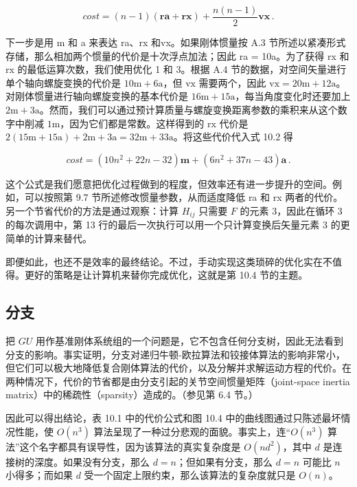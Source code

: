 \documentclass[10pt,a4paper]{book}
\theoremstyle{thmstyle} %
\theoremstyle{defstyle} %
\theoremstyle{prostyle} %
\begin{document}
$$
c o s t = ( n - 1 ) ( \mathbf { r a } + \mathbf { r x } ) + { \frac { n ( n - 1 ) } { 2 } } \mathbf { v x } \, .
$$



下一步是用 m 和 a 来表达 ra、rx 和vx。如果刚体惯量按 A.3 节所述以紧凑形式存储，那么相加两个惯量的代价是十次浮点加法；因此 ra = 10a。为了获得 rx 和 rx 的最低运算次数，我们使用优化 1 和 3。根据 A.4 节的数据，对空间矢量进行单个轴向螺旋变换的代价是 $10\mathrm{m}+6\mathrm{a}$，但 $\mathrm{v}\mathrm{x}$ 需要两个，因此 $\mathrm{v}\mathrm{x}=20\mathrm{m}+12\mathrm{a}$。对刚体惯量进行轴向螺旋变换的基本代价是 $16\mathrm{m}+15\mathrm{a}$，每当角度变化时还要加上 $2\mathrm{m}+3\mathrm{a}$。然而，我们可以通过预计算质量与螺旋变换距离参数的乘积来从这个数字中削减 $1\mathrm{m}$，因为它们都是常数。这样得到的 rx 代价是 $2(15\mathrm{m}+15\mathrm{a})+2\mathrm{m}+3\mathrm{a}=32\mathrm{m}+33\mathrm{a}$。将这些代价代入式 10.2 得



$$
c o s t = ( 10 n ^{2} + 22 n - 32 ) \mathbf { m } + ( 6 n ^{2} + 37 n - 43 ) \mathbf { a } \, .
$$



这个公式是我们愿意把优化过程做到的程度，但效率还有进一步提升的空间。例如，可以按照第 9.7 节所述修改惯量参数，从而适度降低 ra 和 rx 两者的代价。另一个节省代价的方法是通过观察：计算 $H_{ij}$ 只需要 $F$ 的元素 3，因此在循环 3 的每次调用中，第 13 行的最后一次执行可以用一个只计算变换后矢量元素 3 的更简单的计算来替代。



即便如此，也还不是效率的最终结论。不过，手动实现这类琐碎的优化实在不值得。更好的策略是让计算机来替你完成优化，这就是第 10.4 节的主题。



\subsection{分支}





把 $GU$ 用作基准刚体系统组的一个问题是，它不包含任何分支树，因此无法看到分支的影响。事实证明，分支对递归牛顿-欧拉算法和铰接体算法的影响非常小，但它们可以极大地降低复合刚体算法的代价，以及分解并求解运动方程的代价。在两种情况下，代价的节省都是由分支引起的关节空间惯量矩阵（joint-space inertia matrix）中的稀疏性（sparsity）造成的。（参见第 6.4 节。）



因此可以得出结论，表 10.1 中的代价公式和图 10.4 中的曲线图通过只陈述最坏情况性能，使 $O(n^3)$ 算法呈现了一种过分悲观的面貌。事实上，连“$O(n^3)$ 算法”这个名字都具有误导性，因为该算法的真实复杂度是 $O(nd^2)$，其中 $d$ 是连接树的深度。如果没有分支，那么 $d=n$；但如果有分支，那么 $d=n$ 可能比 $n$ 小得多；而如果 $d$ 受一个固定上限约束，那么该算法的复杂度就只是 $O(n)$。
\end{document}
